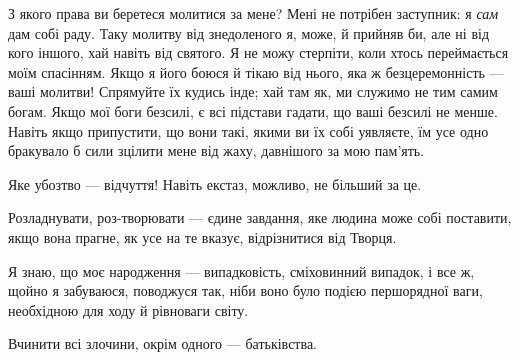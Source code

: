 \begin{aphorism}
З якого права ви беретеся молитися за мене? Мені не потрібен заступник: я \textit{сам} дам собі раду.
Таку молитву від знедоленого я, може, й прийняв би, але ні від кого іншого, хай навіть від святого.
Я не можу стерпіти, коли хтось переймається моїм спасінням. Якщо я його боюся й тікаю від нього, яка ж безцеремонність — ваші молитви!
Спрямуйте їх кудись інде; хай там як, ми служимо не тим самим богам.
Якщо мої боги безсилі, є всі підстави гадати, що ваші безсилі не менше.
Навіть якщо припустити, що вони такі, якими ви їх собі уявляєте, їм усе одно бракувало б сили зцілити мене від жаху, давнішого за мою пам'ять.
\end{aphorism}

\asterism

\begin{aphorism}
Яке убозтво — відчуття! Навіть екстаз, можливо, не більший за це.
\end{aphorism}

\asterism

\begin{aphorism}
Розладнувати, роз-творювати — єдине завдання, яке людина може собі поставити, якщо вона прагне, як усе на те вказує, відрізнитися від Творця.
\end{aphorism}

\asterism

\begin{aphorism}
Я знаю, що моє народження — випадковість, сміховинний випадок, і все ж, щойно я забуваюся, поводжуся так, ніби воно було подією першорядної ваги, необхідною для ходу й
рівноваги світу.
\end{aphorism}

\asterism

\begin{aphorism}
Вчинити всі злочини, окрім одного — батьківства.
\end{aphorism}

\asterism